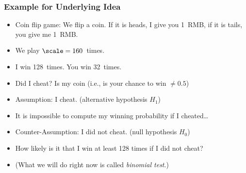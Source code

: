\documentclass[aspectratio=169,mathserif,notheorems]{beamer}%
\begin{document}
\begin{frame}[t]\frametitle{Example for Underlying Idea}%
%
%
%
%
\begin{itemize}%
\item<1-> Coin flip game: We flip a coin. If it is heads, I give you 1~RMB, if it is tails, you give me 1~RMB.%
\item<3-> We play $\scale=160$~times.%
\item<4-> I win 128~times. You win 32~times.%
%
\item<6-> Did I cheat? Is my coin  (i.e., is your chance to win $\neq0.5$)%
\item<7-> \alert<6>{Assumption: I cheat.} (alternative hypothesis $H_1$)%
\item<8-> It is impossible to compute my winning probability if I cheated\dots%
\item<9-> \alert<7>{Counter-Assumption: I did not cheat.} (null hypothesis $H_0$)%
%
\item<10-> How likely is it that I win \alert{at least} 128 times if I did \alert{not} cheat?%
\item<11-> (What we will do right now is called \emph{binomial test}.)%
\end{itemize}%
\end{frame}%
%
%
\end{document}
